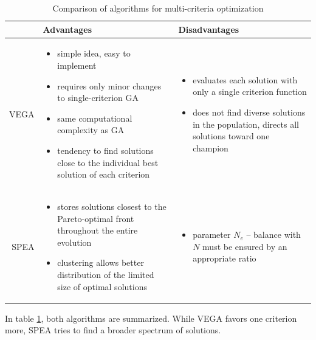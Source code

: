 \begin{table}[bt]
   \begin{center}
    \begin{longtable}{| r || p{} | p{} | }
      \hline
      ~ & Advantages & Disadvantages \\ \hline\hline
      VEGA
      & \begin{itemize}
          \item simple idea, easy to implement
          \item requires only minor changes to single-criterion GA
          \item same computational complexity as GA
          \item tendency to find solutions close to the individual best solution of each criterion
        \end{itemize}
      & \begin{itemize}
          \item evaluates each solution with only a single criterion function
          \item does not find diverse solutions in the population, directs all solutions toward one champion
        \end{itemize}
      \\ \hline
      SPEA
      & \begin{itemize}
         \item stores solutions closest to the Pareto-optimal front throughout the entire evolution
         \item clustering allows better distribution of the limited size of optimal solutions
        \end{itemize}
      & \begin{itemize}
          \item parameter $N_e$ -- balance with $N$ must be ensured by an appropriate ratio
        \end{itemize}
      \\ \hline
    \end{longtable}
    \caption{Comparison of algorithms for multi-criteria optimization}
    \label{vegaSpeaComparison}
  \end{center}
\end{table}

In table \ref{vegaSpeaComparison}, both algorithms are summarized. While VEGA favors one
criterion more, SPEA tries to find a broader spectrum of solutions.

\pagebreak

